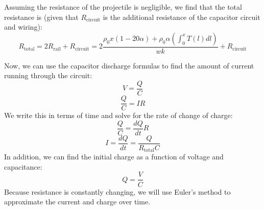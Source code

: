 \documentclass[12pt]{article}
\begin{document}
Assuming the resistance of the projectile is negligible, we find that the total resistance is (given that $R_{\text{circuit}}$ is the additional resistance of the capacitor circuit and wiring):
\begin{equation}
R_{\text{total}} = 2R_{\text{rail}} + R_{\text{circuit}} = 2\frac{\rho_{0}x(1 - 20\alpha) + \rho_{0}\alpha (\int_{0}^{x} T(l) dl)}{wk} + R_{\text{circuit}}
\label{eqn:eqn3}
\end{equation}

Now, we can use the capacitor discharge formulas to find the amount of current running through the circuit:
\begin{equation}
    V = \frac{Q}{C}
\end{equation}
\begin{equation}
    \frac{Q}{C} = IR
\end{equation}
We write this in terms of time and solve for the rate of change of charge:
\begin{equation}
    \frac{Q}{C} = \frac{dQ}{dt} R
\end{equation}
\begin{equation}
    I = \frac{dQ}{dt} = \frac{Q}{R_{\text{total}}C}
    \label{eqn:eqn4}
\end{equation}
In addition, we can find the initial charge as a function of voltage and capacitance:
\begin{equation}
    Q = \frac{V}{C}
    \label{eqn:eqn5}
\end{equation}
Because resistance is constantly changing, we will use Euler's method to approximate the current and charge over time.
\end{document}
